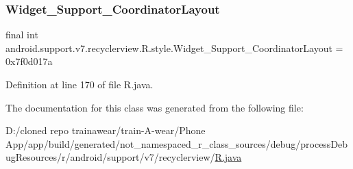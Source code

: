 \subsubsection{\texorpdfstring{Widget\_Support\_CoordinatorLayout}{Widget\_Support\_CoordinatorLayout}}
{\footnotesize\ttfamily final int android.\+support.\+v7.\+recyclerview.\+R.\+style.\+Widget\+\_\+\+Support\+\_\+\+Coordinator\+Layout = 0x7f0d017a\hspace{0.3cm}{\ttfamily [static]}}



Definition at line 170 of file R.\+java.



The documentation for this class was generated from the following file\+:\begin{DoxyCompactItemize}
\item 
D\+:/cloned repo trainawear/train-\/\+A-\/wear/\+Phone App/app/build/generated/not\+\_\+namespaced\+\_\+r\+\_\+class\+\_\+sources/debug/process\+Debug\+Resources/r/android/support/v7/recyclerview/\mbox{\hyperlink{process_debug_resources_2r_2android_2support_2v7_2recyclerview_2_r_8java}{R.\+java}}\end{DoxyCompactItemize}
